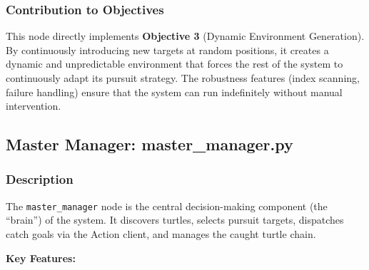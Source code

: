 \documentclass[12pt,a4paper]{article}
\begin{document}
\subsubsection{Contribution to Objectives}

This node directly implements \textbf{Objective 3} (Dynamic Environment Generation). By continuously introducing new targets at random positions, it creates a dynamic and unpredictable environment that forces the rest of the system to continuously adapt its pursuit strategy. The robustness features (index scanning, failure handling) ensure that the system can run indefinitely without manual intervention.

\subsection{Master Manager: master\_manager.py}
\label{subsec:master}

\subsubsection{Description}

The \texttt{master\_manager} node is the central decision-making component (the ``brain'') of the system. It discovers turtles, selects pursuit targets, dispatches catch goals via the Action client, and manages the caught turtle chain.

\textbf{Key Features:}
\end{document}
